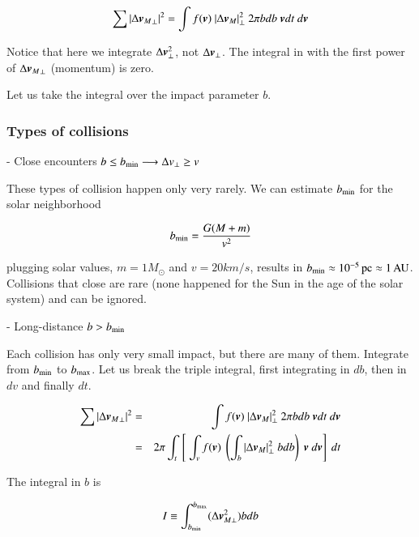 \begin{equation}
\sum |\Delta {\v{v}_M}_\perp|^2 = \int f(\v{v}) \  |\Delta \v{v}_{M}|_\perp^2 \ 2\pi b db \ \v{v} dt \ d\v{v}
\end{equation}

Notice that here we integrate $\Delta {\boldsymbol{v}}_\perp^2$, not $\Delta {\boldsymbol{v}}_\perp$. The integral in with the first power of $\Delta {{\boldsymbol{v}}_M}_\perp$ (momentum) is zero. 

Let us take the integral over the impact parameter $b$. 

\subsubsection{Types of collisions}

- Close encounters $b \leq b_{\rm min} \longrightarrow \Delta v_\perp \geq v$

These types of collision happen only very rarely. We can estimate $b_{\rm min}$ for the solar neighborhood


\begin{equation}
b_{\rm min} = \frac{G(M+m)}{v^2} 
\end{equation}

plugging solar values, $m = 1 M_\odot$ and $v = 20 km/s$, results in $b_{\rm min} \approx 10^{-5} \,\mathrm{pc} \approx 1\,\mathrm{AU}$. Collisions that close are rare (none happened for the Sun in the age of the solar system) and can be ignored. 

- Long-distance $b > b_{\rm min}$

Each collision has only very small impact, but there are many of them. Integrate from $b_{\rm min}$ to $b_{\rm max}$. Let us break the triple integral, first integrating in $db$, then in $dv$ and finally $dt$. 

\begin{eqnarray}
\sum |\Delta {{\boldsymbol{v}}_M}_\perp|^2 &=& \int f({\boldsymbol{v}}) \  |\Delta {\boldsymbol{v}}_{M}|_\perp^2 \ 2\pi b db \ {\boldsymbol{v}} dt \ d{\boldsymbol{v}}\\
&=& 2\pi \int_t \ \left[ \ \int_v f({\boldsymbol{v}}) \  \left(\int_b |\Delta {\boldsymbol{v}}_{M}|_\perp^2 \ b db\right) \ {\boldsymbol{v}} \ d{\boldsymbol{v}}\right] \ dt 
\end{eqnarray}

The integral in $b$ is


\begin{equation}
I \equiv \int_{b_{\rm min}}^{b_{\rm max}} (\Delta {\boldsymbol{v}}_{M\perp}^2) b db   
\end{equation}

